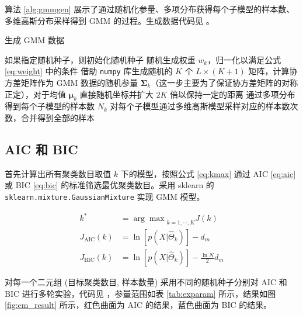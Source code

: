     算法 \ref{alg:gmmgen} 展示了通过随机化参量、多项分布获得每个子模型的样本数、多维高斯分布采样得到 GMM 的过程\cite{gmmgen}。生成数据代码见 。

    \begin{algorithm}
        \caption{生成 GMM 数据}\label{alg:gmmgen}
        如果指定随机种子，则初始化随机种子\;
        随机生成权重 $w_k$，归一化以满足公式 \eqref{eq:weight} 中的条件\;
        借助 \verb"numpy" 库生成随机的 $K$ 个 $L\times (K+1)$ 矩阵，计算协方差矩阵作为 GMM 数据的随机参量 $\bm{\Sigma}_k$（这一步主要为了保证协方差矩阵的对称正定\cite{multinorm}），对于均值 $\bm{\mu}_k$ 直接随机坐标并扩大 $2K$ 倍以保持一定的距离\;
        通过多项分布得到每个子模型的样本数 $N_k$\;
        对每个子模型通过多维高斯模型采样对应的样本数次数，合并得到全部的样本\;
    \end{algorithm}

    \subsection{AIC 和 BIC}

    首先计算出所有聚类数目取值 $k$ 下的模型，按照公式 \eqref{eq:kmax} 通过 AIC \eqref{eq:aic} 或 BIC \eqref{eq:bic} 的标准筛选最优聚类数目。采用 sklearn 的 \verb"sklearn.mixture.GaussianMixture" 实现 GMM 模型\cite{skgmm}。

    \begin{align}
        k^* &= {\arg\max}_{k=1,\cdots,K}J(k) \label{eq:kmax}\\
        J_\text{AIC}(k) &= \ln[p(X|\hat{\Theta}_k)] - d_m \label{eq:aic}\\
        J_\text{BIC}(k) &= \ln[p(X|\hat{\Theta}_k)] - \frac{\ln N}{2}d_m \label{eq:bic} 
    \end{align}

    对每一个二元组 (目标聚类数目, 样本数量) 采用不同的随机种子分别对 AIC 和 BIC 进行多轮实验，代码见 ，参量范围如表 \ref{tab:exparam} 所示，结果如图 \ref{fig:em_result} 所示，红色曲面为 AIC 的结果，蓝色曲面为 BIC 的结果。

